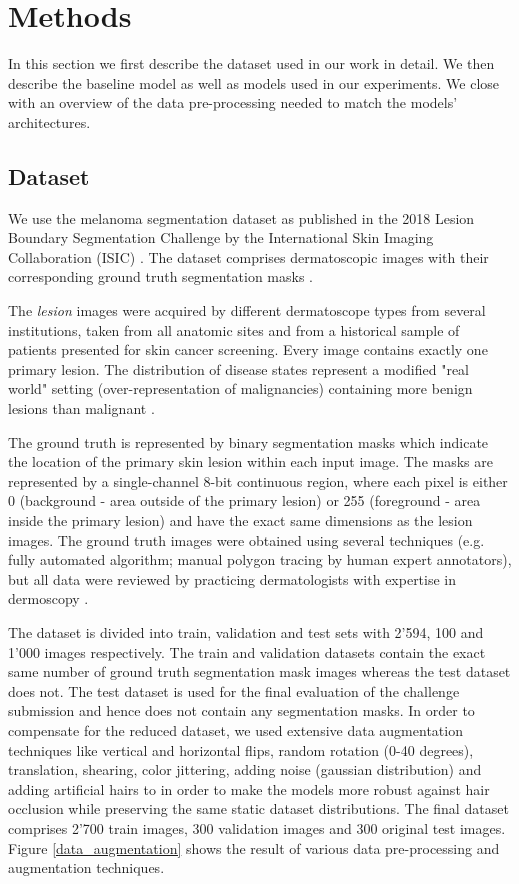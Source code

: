 \section{Methods}
In this section we first describe the dataset used in our work in detail. We then describe the baseline model as well as models used in our experiments. We close with an overview of the data pre-processing needed to match the models’ architectures.

\subsection{Dataset}
\label{dataset}
We use the melanoma segmentation dataset as published in the 2018 Lesion Boundary Segmentation Challenge by the International Skin Imaging Collaboration (ISIC) \citep{isic-2018-segmentation}. The dataset comprises dermatoscopic images with their corresponding ground truth segmentation masks \citep{ensambles-2016-codella}.

\par
The \emph{lesion} images were acquired by different dermatoscope types from several institutions, taken from all anatomic sites and from a historical sample of patients presented for skin cancer screening. Every image contains exactly one primary lesion. The distribution of disease states represent a modified "real world" setting (over-representation of malignancies) containing more benign lesions than malignant \citep{isic-2018-segmentation}.

\par
The ground truth is represented by binary segmentation masks which indicate the location of the primary skin lesion within each input image. The masks are represented by a single-channel 8-bit continuous region, where each pixel is either 0 (background - area outside of the primary lesion) or 255 (foreground - area inside the primary lesion) and have the exact same dimensions as the lesion images. The ground truth images were obtained using several techniques (e.g. fully automated algorithm; manual polygon tracing by human expert annotators), but all data were reviewed by practicing dermatologists with expertise in dermoscopy \citep{isic-2018-segmentation,ensambles-2016-codella}.

\par
The dataset is divided into train, validation and test sets with 2’594, 100 and 1’000 images respectively. The train and validation datasets contain the exact same number of ground truth segmentation mask images whereas the test dataset does not. The test dataset is used for the final evaluation of the challenge submission and hence does not contain any segmentation masks. In order to compensate for the reduced dataset, we used extensive data augmentation techniques like vertical and horizontal flips, random rotation (0-40 degrees), translation, shearing, color jittering, adding noise (gaussian distribution) and adding artificial hairs to in order to make the models more robust against hair occlusion while preserving the same static dataset distributions. The final dataset comprises 2’700 train images, 300 validation images and 300 original test images. Figure \ref{data_augmentation} shows the result of various data pre-processing and augmentation techniques.


